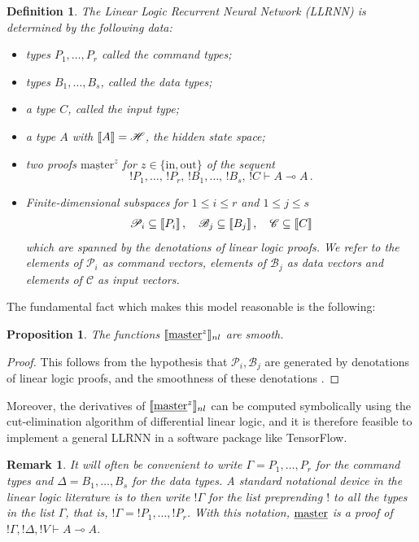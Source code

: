 \documentclass[english,letter paper,12pt,leqno]{article}
\newtheorem{proposition}[theorem]{Proposition}
\theoremstyle{example}
\newtheorem{definition}[theorem]{Definition}
\newtheorem{remark}[theorem]{Remark}
\numberwithin{equation}{section}
\def\be{\begin{equation}}
\def\ee{\end{equation}}
\begin{document}
\begin{definition} The Linear Logic Recurrent Neural Network (LLRNN) is determined by the following data:
\begin{itemize}
\item types $P_1,\ldots,P_r$ called the \emph{command types};
\item types $B_1,\ldots,B_s$, called the \emph{data types};
\item a type $C$, called the \emph{input type};
\item a type $A$ with $\llbracket A \rrbracket = \mathscr{H}$, the hidden state space;
\item two proofs $\underline{\mathrm{master}}^z$ for $z \in \{\mathrm{in},\mathrm{out}\}$ of the sequent
\be
{!} P_1, \ldots, \, {!}P_r,\, {!} B_1, \ldots,\, {!} B_s,\, {!} C \vdash A \multimap A\,.
\ee
\item Finite-dimensional subspaces for $1 \le i \le r$ and $1 \le j \le s$
\be
\mathscr{P}_i \subseteq \den{P_i}\,, \quad \mathscr{B}_j \subseteq \den{B_j}\,, \quad \mathscr{C} \subseteq \den{C}
\ee
which are spanned by the denotations of linear logic proofs. We refer to the elements of $\mathscr{P}_i$ as \emph{command vectors}, elements of $\mathscr{B}_j$ as \emph{data vectors} and elements of $\mathscr{C}$ as \emph{input vectors}.
\end{itemize}
\end{definition}

The fundamental fact which makes this model reasonable is the following:

\begin{proposition} The functions $\llbracket \underline{\textup{master}}^z \rrbracket_{nl}$ are smooth.
\end{proposition}
\begin{proof}
This follows from the hypothesis that $\mathscr{P}_i, \mathscr{B}_j$ are generated by denotations of linear logic proofs, and the smoothness of these denotations \cite{murfetclift}.
\end{proof}

Moreover, the derivatives of $\llbracket \underline{\textup{master}}^z \rrbracket_{nl}$ can be computed symbolically using the cut-elimination algorithm of differential linear logic, and it is therefore feasible to implement a general LLRNN in a software package like TensorFlow. 

\begin{remark}\label{remark:sequentbang} It will often be convenient to write $\Gamma = P_1, \ldots, P_r$ for the command types and $\Delta = B_1, \ldots, B_s$ for the data types. A standard notational device in the linear logic literature is to then write ${!} \Gamma$ for the list preprending ${!}$ to all the types in the list $\Gamma$, that is, ${!} \Gamma = {!} P_1, \ldots, {!} P_r$. With this notation, $\underline{\textup{master}}$ is a proof of ${!} \Gamma, {!} \Delta, {!} V \vdash A \multimap A$.
\end{remark}
\end{document}
